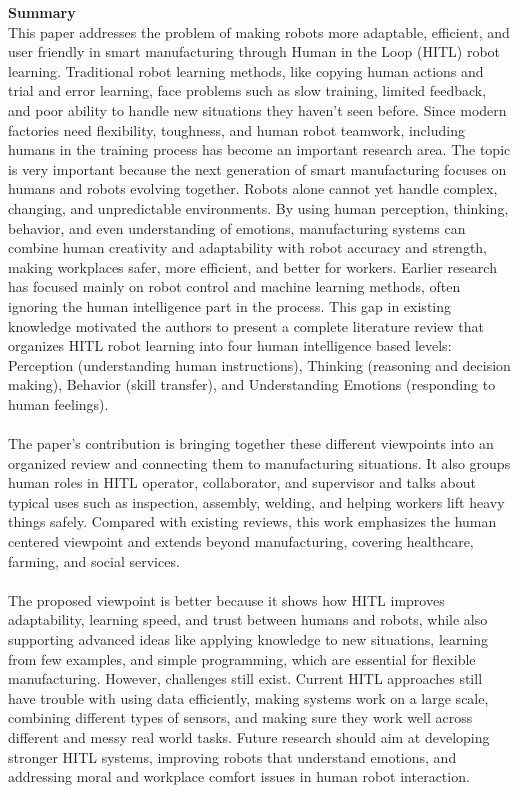 \documentclass[report.tex]{subfiles}
\begin{document}
\noindent\textbf{Summary} \\
This paper addresses the problem of making robots more adaptable, efficient, and user friendly in smart manufacturing through Human in the Loop (HITL) robot learning. Traditional robot learning methods, like copying human actions and trial and error learning, face problems such as slow training, limited feedback, and poor ability to handle new situations they haven't seen before. Since modern factories need flexibility, toughness, and human robot teamwork, including humans in the training process has become an important research area.
The topic is very important because the next generation of smart manufacturing focuses on humans and robots evolving together. Robots alone cannot yet handle complex, changing, and unpredictable environments. By using human perception, thinking, behavior, and even understanding of emotions, manufacturing systems can combine human creativity and adaptability with robot accuracy and strength, making workplaces safer, more efficient, and better for workers.
Earlier research has focused mainly on robot control and machine learning methods, often ignoring the human intelligence part in the process. This gap in existing knowledge motivated the authors to present a complete literature review that organizes HITL robot learning into four human intelligence based levels: Perception (understanding human instructions), Thinking (reasoning and decision making), Behavior (skill transfer), and Understanding Emotions (responding to human feelings).\\\\
The paper's contribution is bringing together these different viewpoints into an organized review and connecting them to manufacturing situations. It also groups human roles in HITL operator, collaborator, and supervisor and talks about typical uses such as inspection, assembly, welding, and helping workers lift heavy things safely. Compared with existing reviews, this work emphasizes the human centered viewpoint and extends beyond manufacturing, covering healthcare, farming, and social services.
\noindent\textbf{}\\\\The proposed viewpoint is better because it shows how HITL improves adaptability, learning speed, and trust between humans and robots, while also supporting advanced ideas like applying knowledge to new situations, learning from few examples, and simple programming, which are essential for flexible manufacturing.
However, challenges still exist. Current HITL approaches still have trouble with using data efficiently, making systems work on a large scale, combining different types of sensors, and making sure they work well across different and messy real world tasks. Future research should aim at developing stronger HITL systems, improving robots that understand emotions, and addressing moral and workplace comfort issues in human robot interaction.\\\\
\end{document}
